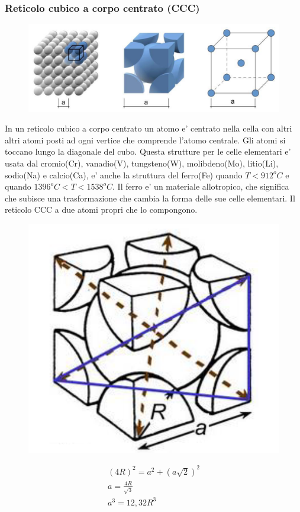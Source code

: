 \documentclass{article}
\begin{document}
            \subsubsection{Reticolo cubico a corpo centrato (CCC)}
                \begin{figure}[h!]
                    \centering
                    \includegraphics[width=\linewidth]{Reticolo cubico a corpo centrato.png}
                \end{figure}
                In un reticolo cubico a corpo centrato un atomo e' centrato nella cella con altri altri atomi posti ad ogni vertice che comprende l'atomo centrale.
                Gli atomi si toccano lungo la diagonale del cubo.
                \newline \newline Questa strutture per le celle elementari e' usata dal cromio(Cr), vanadio(V), tungsteno(W), molibdeno(Mo), litio(Li), sodio(Na) e calcio(Ca), e' anche
                la struttura del ferro(Fe) quando $T<912^o C$ e quando $1396^o C<T<1538^o C$.
                \newline \newline Il ferro e' un materiale allotropico, che significa che subisce una trasformazione che cambia la forma delle sue celle elementari.
                \newline \newline Il reticolo CCC a due atomi propri che lo compongono.
                \begin{figure}[h!]
                    \centering
                    \includegraphics[width=0.5\linewidth]{CCC calcolo}
                \end{figure}
                \begin{gather}
                    (4R)^2 = a^2 + (a \sqrt{2})^2 \\
                    a = \frac{4R}{\sqrt{3}} \label{CCC_reference} \\
                    a^3 = 12,32 R^3
                \end{gather}
\end{document}
